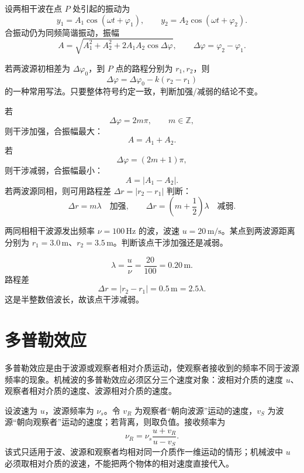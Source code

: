设两相干波在点 $P$ 处引起的振动为
\[
  y_1=A_1\cos(\omega t+\varphi_1),\qquad
  y_2=A_2\cos(\omega t+\varphi_2).
\]
合振动仍为同频简谐振动，振幅
\[
  A=\sqrt{A_1^2+A_2^2+2A_1A_2\cos\Delta\varphi},
  \qquad
  \Delta\varphi=\varphi_2-\varphi_1.
\]

若两波源初相差为 $\Delta\varphi_0$，到 $P$ 点的路程分别为 $r_1,r_2$，则
\[
  \Delta\varphi=\Delta\varphi_0-k(r_2-r_1)
\]
的一种常用写法。只要整体符号约定一致，判断加强/减弱的结论不变。

\begin{summary}[干涉加强与减弱]
若
\[
  \Delta\varphi=2m\pi,\qquad m\in\mathbb Z,
\]
则干涉加强，合振幅最大：
\[
  A=A_1+A_2.
\]
若
\[
  \Delta\varphi=(2m+1)\pi,
\]
则干涉减弱，合振幅最小：
\[
  A=|A_1-A_2|.
\]
若两波源同相，则可用路程差 $\Delta r=|r_2-r_1|$ 判断：
\[
  \Delta r=m\lambda \quad \text{加强},\qquad
  \Delta r=\left(m+\frac12\right)\lambda \quad \text{减弱}.
\]
\end{summary}

\begin{example}[title={相干波干涉判断}]\label{eg:interference-example}
两同相相干波源发出频率 $\nu=100\,\mathrm{Hz}$ 的波，波速 $u=20\,\mathrm{m/s}$。某点到两波源距离分别为 $r_1=3.0\,\mathrm{m}$、$r_2=3.5\,\mathrm{m}$。判断该点干涉加强还是减弱。

\begin{solution}
\[
  \lambda=\frac{u}{\nu}=\frac{20}{100}=0.20\,\mathrm{m}.
\]
路程差
\[
  \Delta r=|r_2-r_1|=0.5\,\mathrm{m}=2.5\lambda.
\]
这是半整数倍波长，故该点干涉减弱。
\end{solution}
\end{example}

\section{多普勒效应}

多普勒效应是由于波源或观察者相对介质运动，使观察者接收到的频率不同于波源频率的现象。机械波的多普勒效应必须区分三个速度对象：波相对介质的速度 $u$、观察者相对介质的速度、波源相对介质的速度。

\begin{method}[一维声波多普勒公式]
设波速为 $u$，波源频率为 $\nu_s$。令 $v_R$ 为观察者“朝向波源”运动的速度，$v_S$ 为波源“朝向观察者”运动的速度；若背离，则取负值。接收频率为
\[
  \nu_R=\nu_s\frac{u+v_R}{u-v_S}.
\]
该式只适用于波、波源和观察者均相对同一介质作一维运动的情形；机械波中 $u$ 必须取相对介质的波速，不能把两个物体的相对速度直接代入。
\end{method}


